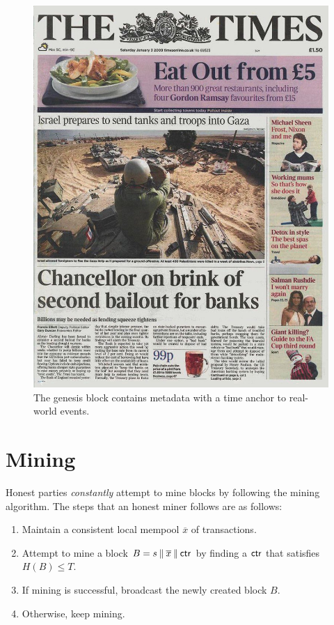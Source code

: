 \begin{figure}[h]
    \centering
    \includegraphics[width=1 \columnwidth,keepaspectratio]{figures/thetimes.jpg}
    \caption{The genesis block contains metadata with a time anchor to real-world events.}
    \label{fig.thetimes}
\end{figure}

\section{Mining}

Honest parties \emph{constantly} attempt to mine blocks by following the mining algorithm.
The steps that an honest miner follows are as follows:

\begin{enumerate}
  \item Maintain a consistent local mempool $\overline{x}$ of transactions.
  \item Attempt to mine a block $B = s \mathbin{\|} \overline{x} \mathbin{\|} \mathsf{ctr}$ by finding a $\mathsf{ctr}$ that satisfies $H(B) \leq T$.
  \item If mining is successful, broadcast the newly created block $B$.
  \item Otherwise, keep mining.
\end{enumerate}

